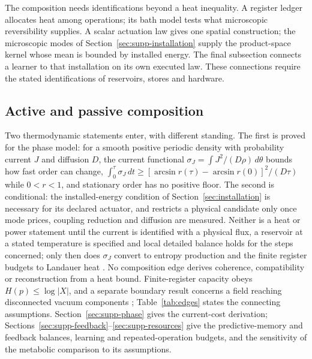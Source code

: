 \documentclass{article}
\renewcommand{\cite}[1]{\citep{#1}}
\begin{document}
The composition needs identifications beyond a heat inequality. A register ledger allocates heat among operations; its bath model tests what microscopic reversibility supplies. A scalar actuation law gives one spatial construction; the microscopic modes of Section~\ref{sec:supp-installation} supply the product-space kernel whose mean is bounded by installed energy. The final subsection connects a learner to that installation on its own executed law. These connections require the stated identifications of reservoirs, stores and hardware.

\subsection{Active and passive composition}
\label{sec:supp-composition}

Two thermodynamic statements enter, with different standing. The first is proved for the phase model: for a smooth positive periodic density with probability current $J$ and diffusion $D$, the current functional $\sigma_J=\int J^2/(D\rho)\,d\theta$ bounds how fast order can change, $\int_0^\tau\sigma_J\,dt\geq[\arcsin r(\tau)-\arcsin r(0)]^2/(D\tau)$ while $0<r<1$, and stationary order has no positive floor. The second is conditional: the installed-energy condition of Section~\ref{sec:installation} is necessary for its declared actuator, and restricts a physical candidate only once mode prices, coupling reduction and diffusion are measured. Neither is a heat or power statement until the current is identified with a physical flux, a reservoir at a stated temperature is specified and local detailed balance holds for the steps concerned; only then does $\sigma_J$ convert to entropy production and the finite register budgets to Landauer heat \cite{landauer1961,norton2005,shenker2000}. No composition edge derives coherence, compatibility or reconstruction from a heat bound. Finite-register capacity obeys $H(p)\leq\log|X|$, and a separate boundary result concerns a field reaching disconnected vacuum components \cite{kibble1976}; Table~\ref{tab:edges} states the connecting assumptions. Section~\ref{sec:supp-phase} gives the current-cost derivation; Sections~\ref{sec:supp-feedback}--\ref{sec:supp-resources} give the predictive-memory and feedback balances, learning and repeated-operation budgets, and the sensitivity of the metabolic comparison to its assumptions.
\end{document}
